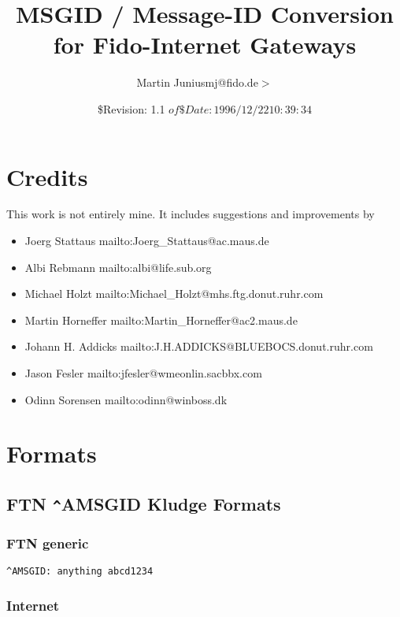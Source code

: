 \documentclass{article}
\title{MSGID / Message-ID Conversion for Fido-Internet Gateways }
\author{Martin Junius{\ttfamily  {\(<\)}mj@fido.de{\(>\)}} }
\date{\$Revision: 1.1 $ of \$Date: 1996/12/22 10:39:34 $ }
\begin{document}
\maketitle

\section{Credits }



This work is not entirely mine. It includes suggestions and improvements by 
\begin{itemize}
\item Joerg Stattaus 
mailto:Joerg\_Stattaus@ac.maus.de 
\item Albi Rebmann 
mailto:albi@life.sub.org 
\item Michael Holzt 
mailto:Michael\_Holzt@mhs.ftg.donut.ruhr.com 
\item Martin Horneffer 
mailto:Martin\_Horneffer@ac2.maus.de 
\item Johann H. Addicks 
mailto:J.H.ADDICKS@BLUEBOCS.donut.ruhr.com 
\item Jason Fesler 
mailto:jfesler@wmeonlin.sacbbx.com 
\item Odinn Sorensen 
mailto:odinn@winboss.dk  
\end{itemize}



\section{Formats }




\subsection{FTN \verb+^+AMSGID Kludge Formats }




\subsubsection{FTN generic }

\begin{verbatim}
^AMSGID: anything abcd1234 
\end{verbatim}



\subsubsection{Internet }
\end{document}
